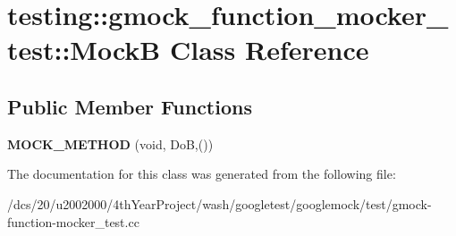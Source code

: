 \hypertarget{classtesting_1_1gmock__function__mocker__test_1_1MockB}{}\section{testing\+:\+:gmock\+\_\+function\+\_\+mocker\+\_\+test\+:\+:MockB Class Reference}
\label{classtesting_1_1gmock__function__mocker__test_1_1MockB}
\subsection*{Public Member Functions}
\begin{DoxyCompactItemize}
\item 
\mbox{\label{classtesting_1_1gmock__function__mocker__test_1_1MockB_a4e897dd85777bec4fae42b78d4222f9b}} 
{\bfseries M\+O\+C\+K\+\_\+\+M\+E\+T\+H\+OD} (void, DoB,())
\end{DoxyCompactItemize}


The documentation for this class was generated from the following file\+:\begin{DoxyCompactItemize}
\item 
/dcs/20/u2002000/4th\+Year\+Project/wash/googletest/googlemock/test/gmock-\/function-\/mocker\+\_\+test.\+cc\end{DoxyCompactItemize}
